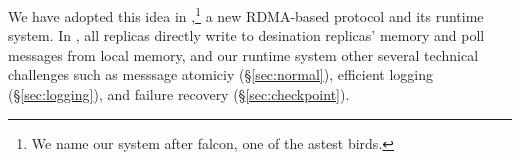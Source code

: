 % 
% 
% 

We have adopted this idea in \xxx,\footnote{We name our system after 
falcon, one of the astest birds.} a new RDMA-based \paxos protocol and its 
runtime system. In \xxx, all replicas directly write to desination 
replicas' memory and poll messages from local memory, and our runtime system 
other several technical challenges such as messsage atomiciy 
(\S\ref{sec:normal}), efficient logging (\S\ref{sec:logging}), and failure 
recovery (\S\ref{sec:checkpoint}).

